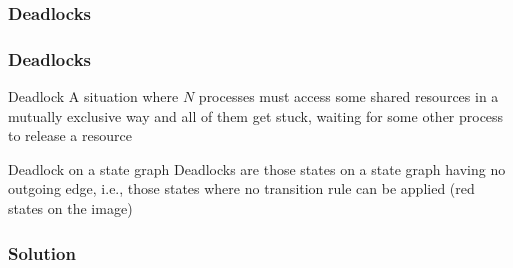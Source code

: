 \documentclass[presentation]{beamer}\mode<presentation>{\usetheme{AMSCesenaPurpleAndGold}}
\begin{document}
\subsubsection{Deadlocks}

\begin{frame}
\frametitle{Deadlocks}
    \begin{block}{Deadlock}
        A situation where $N$ processes must access some shared resources in a mutually exclusive way and all of them get stuck, waiting for some other process to release a resource
    \end{block}
    
    \vfill
    
    \begin{alertblock}{Deadlock on a state graph}
        Deadlocks are those states on a state graph having \alert{no outgoing edge}, i.e., those states where \alert{no transition rule} can be applied (red states on the image)
    \end{alertblock}

\end{frame}

\subsubsection{Solution}
\end{document}
